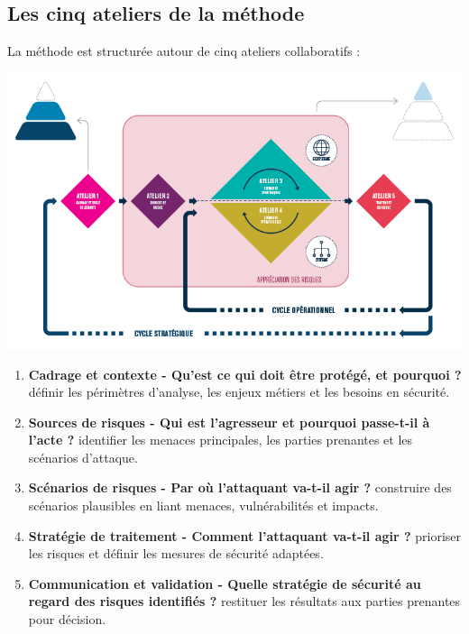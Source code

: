 \documentclass[french, 12pt]{article}%
\begin{document}
\subsection*{Les cinq ateliers de la méthode}

La méthode est structurée autour de cinq ateliers collaboratifs :


\begin{center}
\includegraphics[scale=0.7]{./ressource/atelierIterative.png}
\end{center}

\begin{enumerate}[label=\textbf{Atelier \arabic* :}, leftmargin=1.5cm]
    \item \textbf{Cadrage et contexte - Qu’est ce qui doit être protégé, et pourquoi ?} définir les périmètres d'analyse, les enjeux métiers et les besoins en sécurité.
    \item \textbf{Sources de risques - Qui est l’agresseur et pourquoi passe-t-il à l’acte ?} identifier les menaces principales, les parties prenantes et les scénarios d'attaque.
    \item \textbf{Scénarios de risques - Par où l’attaquant va-t-il agir ?} construire des scénarios plausibles en liant menaces, vulnérabilités et impacts.
    \item \textbf{Stratégie de traitement - Comment l’attaquant va-t-il agir ?} prioriser les risques et définir les mesures de sécurité adaptées.
    \item \textbf{Communication et validation - Quelle stratégie de sécurité au regard des risques identifiés ?} restituer les résultats aux parties prenantes pour décision.
\end{enumerate}
\end{document}
